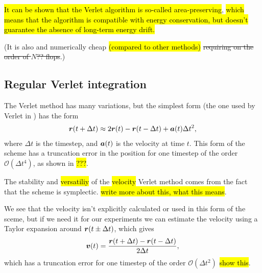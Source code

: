 \hl{It can be shown that the Verlet algorithm is so-called area-preserving}\cite[section 4.3.3]{frenkel2001understanding}, \hl{which means that the algorithm is compatible with energy conservation, but doesn't guarantee the absence of long-term energy drift.}

(It is also and numerically cheap \hl{(compared to other methods)} \st{requiring on the order of $N$?? flops}.)


\subsection{Regular Verlet integration}
The Verlet method has many variations, but the simplest form (the one used by Verlet in \cite{verlet1967computer}) has the form
\begin{align}
    \boldsymbol{r}(t + \Delta t) \approx 2\boldsymbol{r}(t) - \boldsymbol{r}(t - \Delta t) + \boldsymbol{a}(t)\Delta t^2,
    \label{eq:regular_verlet}
\end{align}
where $\Delta t$ is the timestep, and $\boldsymbol{a}(t)$ is the velocity at time $t$. This form of the scheme has a truncation error in the position for one timestep of the order $\mathcal{O}(\Delta t^4)$, as shown in \hl{???}.

The stability and \hl{versatiliy} of the \hl{velocity} Verlet method comes from the fact that the scheme is symplectic. \hl{write more about this, what this means}.

We see that the velocity isn't explicitly calculated or used in this form of the sceme, but if we need it for our experiments we can estimate the velocity using a Taylor expansion around $\boldsymbol{r}(t\pm\Delta t)$, which gives
\begin{align*}
    \boldsymbol{v}(t) = \frac{\boldsymbol{r}(t + \Delta t) - \boldsymbol{r}(t - \Delta t)}{2\Delta t},
\end{align*}
which has a truncation error for one timestep of the order $\mathcal{O}(\Delta t^2)$ \hl{show this}. 

